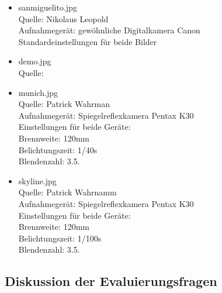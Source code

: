 \documentclass[deutsch]{scrartcl}
\begin{document}
\begin{itemize}
	\item sanmiguelito.jpg\\
		Quelle: Nikolaus Leopold \\
		Aufnahmegerät: gewöhnliche Digitalkamera Canon\\
		Standardeinstellungen für beide Bilder

	\item demo.jpg\\
		Quelle: \cite{pandemo}

	\item munich.jpg\\
		Quelle: Patrick Wahrman\\
		Aufnahmegerät: Spiegelreflexkamera Pentax K30 \\
		Einstellungen für beide Geräte: \\
		Brennweite: 120mm \\
		Belichtungszeit: 1/40s \\
		Blendenzahl: 3.5.

	\item skyline.jpg\\
		Quelle: Patrick Wahrnamm\\
		Aufnahmegerät: Spiegelreflexkamera Pentax K30 \\
		Einstellungen für beide Geräte: \\
		Brennweite: 120mm \\
		Belichtungszeit: 1/100s\\
		Blendenzahl: 3.5.
\end{itemize}

\subsection{Diskussion der Evaluierungsfragen}
\end{document}
